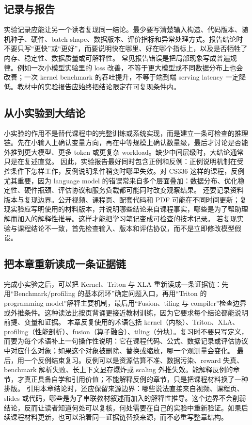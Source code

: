 \documentclass[a4paper]{article}
\begin{document}
\subsection{记录与报告}
实验记录应能让另一个读者复现同一结论。最少要写清楚输入构造、代码版本、随机种子、硬件、batch shape、数据版本、评价指标和异常处理方式。报告结论时不要只写“更快”或“更好”，而要说明快在哪里、好在哪个指标上，以及是否牺牲了内存、稳定性、数据质量或可解释性。
常见报告错误是把局部现象写成普遍规律。例如一次小模型实验里的 loss 改善，不等于更大模型或不同数据分布上也会改善；一次 kernel benchmark 的吞吐提升，不等于端到端 serving latency 一定降低。教材中的实验报告应始终把结论限定在可复现条件内。
\subsection{从小实验到大结论}
小实验的作用不是替代课程中的完整训练或系统实现，而是建立一条可检查的推理链。先在小输入上确认变量方向，再在中等规模上确认数量级，最后才讨论是否能外推到更大模型、更多 token 或更复杂 workload。缺少中间层级时，大结论通常只是在复述直觉。
因此，实验报告最好同时包含正例和反例：正例说明机制在受控条件下怎样工作，反例说明条件稍变时哪里失效。对 CS336 这样的课程，反例尤其重要，因为 language model 的错误常来自多个层面叠加：数据分布、优化稳定性、硬件瓶颈、评估协议和服务负载都可能同时改变观察结果。
还要记录资料版本与复现边界。公开视频、课程页、配套代码和 PDF 可能在不同时间更新；复现实验应写明使用的材料版本，并说明哪些结论来自课程事实，哪些是为了帮助理解而加入的解释性推导。这样才能把学习笔记变成可检查的技术记录。
若复现实验与课程结论不一致，首先检查输入、版本和评估协议，而不是立即修改模型假设。
\subsection{把本章重新读成一条证据链}
完成小实验之后，可以把 Kernel、Triton 与 XLA 重新读成一条证据链：先用“Benchmark/profiling 的基本闭环”确定问题入口，再用“Triton 的 programming model”解释主要机制，最后用“Fusion、tiling 与 compiler”检查边界或外推条件。这种读法比按页背诵更接近教材训练，因为它要求每个结论都能说明前提、变量和证据。
本章反复使用的术语包括 kernel（内核）、Triton、XLA、profiling（性能剖析）、fusion（算子融合）、tiling（分块）。复习时不要只写定义，而要为每个术语补上一句操作性说明：它在课程代码、公式、数据记录或评估协议中对应什么对象；如果这个对象被删除、替换或缩放，哪一个观测量会变化。
最后，用一个反例结束复习。反例可以是资源估算不准、数据污染、reward 失真、benchmark 解析失败、长上下文显存爆炸或 scaling 外推失效。能解释反例的章节，才真正具备自学和引用价值；不能解释反例的章节，只是把课程材料换了一种排版。
引用本章结论时，还应保留来源边界：哪些说法直接来自视频、课程页、slides 或代码，哪些是为了串联教材叙述而加入的解释性推导。这个边界不会削弱结论，反而让读者知道何处可以复核，何处需要在自己的实验中重新验证。如果后续课程材料更新，也可以沿着同一证据链替换来源，而不必重写整章结构。
\end{document}
